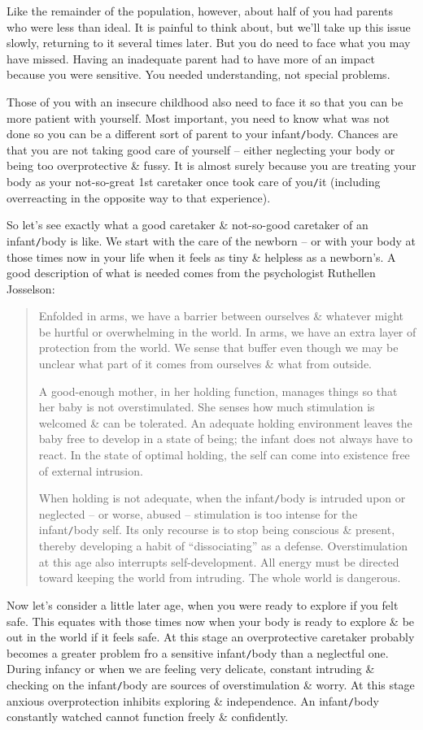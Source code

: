 \documentclass{article}
\numberwithin{equation}{section}
\begin{document}
Like the remainder of the population, however, about half of you had parents who were less than ideal. It is painful to think about, but we'll take up this issue slowly, returning to it several times later. But you do need to face what you may have missed. Having an inadequate parent had to have more of an impact because you were sensitive. You needed understanding, not special problems.

Those of you with an insecure childhood also need to face it so that you can be more patient with yourself. Most important, you need to know what was not done so you can be a different sort of parent to your infant{\tt/}body. Chances are that you are not taking good care of yourself -- either neglecting your body or being too overprotective \& fussy. It is almost surely because you are treating your body as your not-so-great 1st caretaker once took care of you{\tt/}it (including overreacting in the opposite way to that experience).

So let's see exactly what a good caretaker \& not-so-good caretaker of an infant{\tt/}body is like. We start with the care of the newborn -- or with your body at those times now in your life when it feels as tiny \& helpless as a newborn's. A good description of what is needed comes from the psychologist Ruthellen Josselson:
\begin{quotation}
	Enfolded in arms, we have a barrier between ourselves \& whatever might be hurtful or overwhelming in the world. In arms, we have an extra layer of protection from the world. We sense that buffer even though we may be unclear what part of it comes from ourselves \& what from outside.
	
	A good-enough mother, in her holding function, manages things so that her baby is not overstimulated. She senses how much stimulation is welcomed \& can be tolerated. An adequate holding environment leaves the baby free to develop in a state of being; the infant does not always have to react. In the state of optimal holding, the self can come into existence free of external intrusion.
	
	When holding is not adequate, when the infant{\tt/}body is intruded upon or neglected -- or worse, abused -- stimulation is too intense for the infant{\tt/}body self. Its only recourse is to stop being conscious \& present, thereby developing a habit of ``dissociating'' as a defense. Overstimulation at this age also interrupts self-development. All energy must be directed toward keeping the world from intruding. The whole world is dangerous.
\end{quotation}
Now let's consider a little later age, when you were ready to explore if you felt safe. This equates with those times now when your body is ready to explore \& be out in the world if it feels safe. At this stage an overprotective caretaker probably becomes a greater problem fro a sensitive infant{\tt/}body than a neglectful one. During infancy or when we are feeling very delicate, constant intruding \& checking on the infant{\tt/}body are sources of overstimulation \& worry. At this stage anxious overprotection inhibits exploring \& independence. An infant{\tt/}body constantly watched cannot function freely \& confidently.
\end{document}
